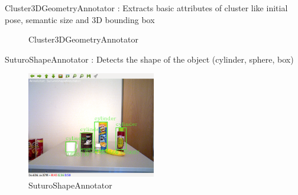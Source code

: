 \documentclass[main.tex]{subfiles}
\begin{document}
\begin{itemize}
	\begin{minipage}[t]{\textwidth}
	\item Cluster3DGeometryAnnotator : Extracts basic attributes of cluster like initial pose, semantic size and 3D bounding box 
		\begin{figure}[H]
   			 \centering
    			 
   			 \caption{Cluster3DGeometryAnnotator}
  		\end{figure}
	\end{minipage}

	\begin{minipage}[t]{\textwidth}
	\item SuturoShapeAnnotator : Detects the shape of the object (cylinder, sphere, box)
		\begin{figure}[H]
   			 \centering
    			 \includegraphics[width=0.5\textwidth]{pictures/2d/SuturoShapeAnnotator.png}
   			 \caption{SuturoShapeAnnotator}
  		\end{figure}
	\end{minipage}


\end{itemize}
\end{document}
